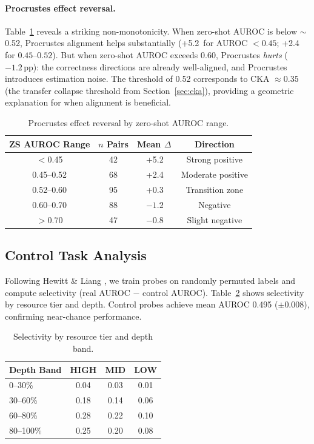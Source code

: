 \documentclass[11pt,a4paper]{article}
\newcommand{\pp}{\,\text{pp}}
\begin{document}
\paragraph{Procrustes effect reversal.}
Table~\ref{tab:procrustes_reversal} reveals a striking non-monotonicity. When zero-shot AUROC is below $\sim$0.52, Procrustes alignment helps substantially (+5.2\pp{} for AUROC $< 0.45$; +2.4\pp{} for $0.45$--$0.52$). But when zero-shot AUROC exceeds 0.60, Procrustes \emph{hurts} ($-1.2\pp$): the correctness directions are already well-aligned, and Procrustes introduces estimation noise. The threshold of 0.52 corresponds to CKA $\approx 0.35$ (the transfer collapse threshold from Section~\ref{sec:cka}), providing a geometric explanation for when alignment is beneficial.

\begin{table}[t]
\centering
\caption{Procrustes effect reversal by zero-shot AUROC range.}
\label{tab:procrustes_reversal}
\small
\begin{tabular}{cccc}
\toprule
ZS AUROC Range & $n$ Pairs & Mean $\Delta$\pp & Direction \\
\midrule
$<$0.45      & 42  & +5.2  & Strong positive \\
0.45--0.52   & 68  & +2.4  & Moderate positive \\
0.52--0.60   & 95  & +0.3  & Transition zone \\
0.60--0.70   & 88  & $-1.2$ & Negative \\
$>$0.70      & 47  & $-0.8$ & Slight negative \\
\bottomrule
\end{tabular}
\end{table}

\subsection{Control Task Analysis}
\label{sec:control}

Following Hewitt \& Liang \cite{hewitt2019designing}, we train probes on randomly permuted labels and compute selectivity (real AUROC $-$ control AUROC). Table~\ref{tab:control_selectivity} shows selectivity by resource tier and depth. Control probes achieve mean AUROC 0.495 ($\pm 0.008$), confirming near-chance performance.

\begin{table}[t]
\centering
\caption{Selectivity by resource tier and depth band.}
\label{tab:control_selectivity}
\small
\begin{tabular}{lccc}
\toprule
Depth Band & HIGH & MID & LOW \\
\midrule
0--30\%   & 0.04 & 0.03 & 0.01 \\
30--60\%  & 0.18 & 0.14 & 0.06 \\
60--80\%  & 0.28 & 0.22 & 0.10 \\
80--100\% & 0.25 & 0.20 & 0.08 \\
\bottomrule
\end{tabular}
\end{table}
\end{document}
